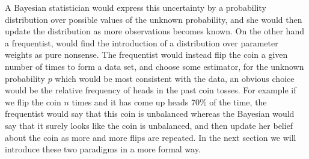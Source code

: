 A Bayesian statistician would express this uncertainty by a probability distribution over possible values of the unknown probability, and she would then update the distribution as more observations becomes known. On the other hand a frequentist, would find the introduction of a distribution over parameter weights as pure nonsense. The frequentist would instead flip the coin a given number of times to form a data set, and choose some estimator, for the unknown probability $p$ which would be most consistent with the data, an obvious choice would be the relative frequency of heads in the past coin tosses. For example if we flip the coin $n$ times and it has come up heads 70\% of the time, the frequentist would say that this coin is unbalanced whereas the Bayesian would say that it surely looks like the coin is unbalanced, and then update her belief about the coin as more and more flips are repeated. In the next section we will introduce these two paradigms in a more formal way.


